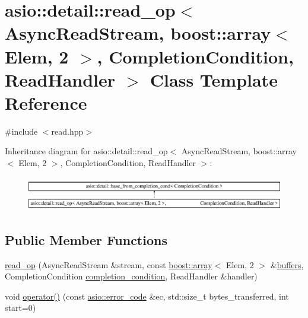 \hypertarget{classasio_1_1detail_1_1read__op_3_01_async_read_stream_00_01boost_1_1array_3_01_elem_00_012_01_4b92266d3d5081f809423aa72530eb694}{}\section{asio\+:\+:detail\+:\+:read\+\_\+op$<$ Async\+Read\+Stream, boost\+:\+:array$<$ Elem, 2 $>$, Completion\+Condition, Read\+Handler $>$ Class Template Reference}
\label{classasio_1_1detail_1_1read__op_3_01_async_read_stream_00_01boost_1_1array_3_01_elem_00_012_01_4b92266d3d5081f809423aa72530eb694}


{\ttfamily \#include $<$read.\+hpp$>$}

Inheritance diagram for asio\+:\+:detail\+:\+:read\+\_\+op$<$ Async\+Read\+Stream, boost\+:\+:array$<$ Elem, 2 $>$, Completion\+Condition, Read\+Handler $>$\+:\begin{figure}[H]
\begin{center}
\leavevmode
\includegraphics[height=1.513514cm]{classasio_1_1detail_1_1read__op_3_01_async_read_stream_00_01boost_1_1array_3_01_elem_00_012_01_4b92266d3d5081f809423aa72530eb694}
\end{center}
\end{figure}
\subsection*{Public Member Functions}
\begin{DoxyCompactItemize}
\item 
\hyperlink{classasio_1_1detail_1_1read__op_3_01_async_read_stream_00_01boost_1_1array_3_01_elem_00_012_01_4b92266d3d5081f809423aa72530eb694_a4b1a4a4387588c4b23710036fa320dbe}{read\+\_\+op} (Async\+Read\+Stream \&stream, const \hyperlink{classboost_1_1array}{boost\+::array}$<$ Elem, 2 $>$ \&\hyperlink{group__async__read_ga54dede45c3175148a77fe6635222c47d}{buffers}, Completion\+Condition \hyperlink{group__async__read_gae2e215d5013596cc2b385bb6c13fa518}{completion\+\_\+condition}, Read\+Handler \&handler)
\item 
void \hyperlink{classasio_1_1detail_1_1read__op_3_01_async_read_stream_00_01boost_1_1array_3_01_elem_00_012_01_4b92266d3d5081f809423aa72530eb694_a301a210d40e99df53bac268ffcef5a2a}{operator()} (const \hyperlink{classasio_1_1error__code}{asio\+::error\+\_\+code} \&ec, std\+::size\+\_\+t bytes\+\_\+transferred, int start=0)
\end{DoxyCompactItemize}

